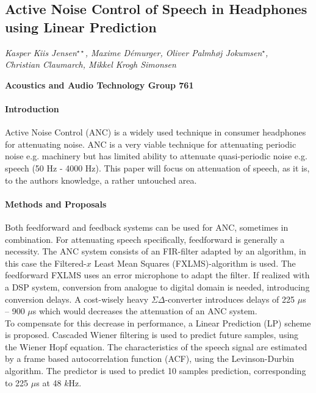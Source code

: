 \documentclass[a4paper]{article}
\title{}
\begin{document}
	
	{\centering
		\subsection*{Active Noise Control of Speech in Headphones using Linear Prediction}}
	
	{\centering
		\textit{Kasper Kiis Jensen$^{\star \star}$, Maxime Démurger, Oliver Palmhøj Jokumsen$^{\star}$,\\ Christian Claumarch, Mikkel Krogh Simonsen}
		\par}
	{\centering
		\textbf{Acoustics and Audio Technology Group 761}
		\par}
	
	\bigskip
	
	\paragraph{Introduction}
	Active Noise Control (ANC) is a widely used technique in consumer headphones for attenuating noise. ANC is a very viable technique for attenuating periodic noise e.g. machinery but has limited ability to attenuate quasi-periodic noise e.g. speech (50 Hz - 4000 Hz). This paper will focus on attenuation of speech, as it is, to the authors knowledge, a rather untouched area. 
	
	\paragraph{Methods and Proposals}
	Both feedforward and feedback systems can be used for ANC, sometimes in combination. For attenuating speech specifically, feedforward is generally a necessity. The ANC system consists of an FIR-filter adapted by an algorithm, in this case the Filtered-$x$ Least Mean Squares (FXLMS)-algorithm is used. The feedforward FXLMS uses an error microphone to adapt the filter. 
	If realized with a DSP system, conversion from analogue to digital domain is needed, introducing conversion delays. A cost-wisely heavy $\Sigma\Delta$-converter introduces delays of 225 $\mu$s -- 900 $\mu$s which would decreases the attenuation of an ANC system. \\
	To compensate for this decrease in performance, a Linear Prediction (LP) scheme is proposed.
	Cascaded Wiener filtering is used to predict future samples, using the Wiener Hopf equation. The characteristics of the speech signal are estimated by a frame based autocorrelation function (ACF), using the Levinson-Durbin algorithm. The predictor is used to predict 10 samples prediction, corresponding to 225 $\mu$s at 48 $k$Hz.
	
\end{document}
